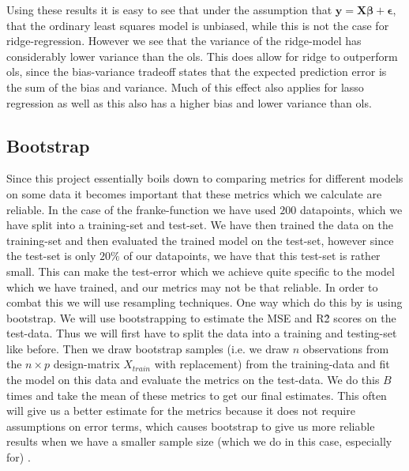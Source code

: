\documentclass{article}
\begin{document}
Using these results it is easy to see that under the assumption that $\mathbf{y}
    = \mathbf{X}\mathbf{\beta} + \mathbf{\epsilon}$, that the ordinary least squares
model is unbiased, while this is not the case for ridge-regression. However we
see that the variance of the ridge-model has considerably lower variance than
the ols. This does allow for ridge to outperform ols, since the bias-variance
tradeoff states that the expected prediction error is the sum of the bias and
variance. Much of this effect also applies for lasso regression as well as this
also has a higher bias and lower variance than ols.

\subsection{Bootstrap}
Since this project essentially boils down to comparing metrics for different
models on some data it becomes important that these metrics which we calculate
are reliable. In the case of the franke-function we have used $200$ datapoints,
which we have split into a training-set and test-set. We have then trained the
data on the training-set and then evaluated the trained model on the test-set,
however since the test-set is only $20\%$ of our datapoints, we have that this
test-set is rather small. This can make the test-error which we achieve quite
specific to the model which we have trained, and our metrics may not be that
reliable. In order to combat this we will use resampling techniques. One way
which do this by is using bootstrap. We will use bootstrapping to estimate the
MSE and R\^2 scores on the test-data. Thus we will first have to split the data
into a training and testing-set like before. Then we draw bootstrap samples
(i.e. we draw $n$ observations from the $n\times p$ design-matrix $X_{train}$
with replacement) from the training-data and fit the model on this data and
evaluate the metrics on the test-data. We do this $B$ times and take the mean of
these metrics to get our final estimates. This often will give us a better
estimate for the metrics because it does not require assumptions on error terms,
which causes bootstrap to give us more reliable results when we have a smaller
sample size (which we do in this case, especially for) \cite[s.~5.3]{lecturenotes5}.
\end{document}
